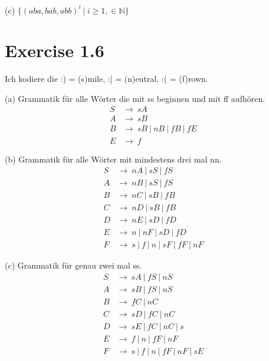 \documentclass{article}
\begin{document}
\noindent (c) $\{(aba,bab,abb)^i\ |\ i\geq 1,\in \mathbb{N} \}$

\section*{Exercise 1.6}

Ich kodiere die  :) = (s)mile, :| = (n)eutral, :( = (f)rown.

\noindent (a) Grammatik f\"ur alle W\"orter die mit ss beginnen und mit ff aufh\"oren.
\begin{align*}
S &\rightarrow\ sA\\
A &\rightarrow\ sB\\
B &\rightarrow\ sB\ |\ nB\ |\ fB\ |\ fE\\
E &\rightarrow\ f\ %
\end{align*}

\noindent (b) Grammatik f\"ur alle W\"orter mit mindestens drei mal nn.
\begin{align*}
S &\rightarrow\ nA\ |\ sS\ |\ fS\\
A &\rightarrow\ nB\ |\ sS\ |\ fS\\
B &\rightarrow\ nC\ |\ sB\ |\ fB\\
C &\rightarrow\ nD\ |\ sB\ |\ fB\\
D &\rightarrow\ nE\ |\ sD\ |\ fD\\
E &\rightarrow\ n\ |\ nF\ |\ sD\ |\ fD\\
F &\rightarrow\ s\ |\ f\ |\ n\ |\ sF\ |\ fF\ |\ nF
\end{align*}

\noindent (c) Grammatik f\"ur genau zwei mal ss.
\begin{align*}
S &\rightarrow\ sA\ |\ fS\ |\ nS\\
A &\rightarrow\ sB\ |\ fS\ |\ nS\\
B &\rightarrow\ fC\ |\ nC\\
C &\rightarrow\ sD\ |\ fC\ |\ nC\\
D &\rightarrow\ sE\ |\ fC\ |\ nC\ |\ s\\
E &\rightarrow\ f\ |\ n\ |\ fF\ |\ nF\\
F &\rightarrow\ s\ |\ f\ |\ n\ |\ fF\ |\ nF\ |\ sE
\end{align*}

\end{document}
